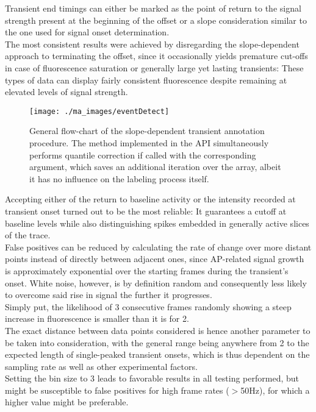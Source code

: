 \documentclass[titlepage]{article}
\begin{document}
Transient end timings can either be marked as the point of return to the signal strength present at the beginning of the offset or a slope consideration similar to the one used for signal onset determination.\\
The most consistent results were achieved by disregarding the slope-dependent approach to terminating the offset, since it occasionally yields premature cut-offs in case of fluorescence saturation or generally large yet lasting transients: These types of data can display fairly consistent fluorescence despite remaining at elevated levels of signal strength.\\
\begin{figure}[h]
\centering
\texttt{[image: ./ma\_images/eventDetect]}
\caption{General flow-chart of the slope-dependent transient annotation procedure. The method implemented in the API simultaneously performs quantile correction if called with the corresponding argument, which saves an additional iteration over the array, albeit it has no influence on the labeling process itself.}
\label{fig:eventDetect}
\end{figure}
Accepting either of the return to baseline activity or the intensity recorded at transient onset turned out to be the most reliable: It guarantees a cutoff at baseline levels while also distinguishing spikes embedded in generally active slices of the trace.\\
False positives can be reduced by calculating the rate of change over more distant points instead of directly between adjacent ones, since AP-related signal growth is approximately exponential over the starting frames during the transient's onset. White noise, however, is by definition random and consequently less likely to overcome said rise in signal the further it progresses.\\
Simply put, the likelihood of 3 consecutive frames randomly showing a steep increase in fluorescence is smaller than it is for 2.\\
The exact distance between data points considered is hence another parameter to be taken into consideration, with the general range being anywhere from 2 to the expected length of single-peaked transient onsets, which is thus dependent on the sampling rate as well as other experimental factors.\\
Setting the bin size to 3 leads to favorable results in all testing performed, but might be susceptible to false positives for high frame rates ($>$50Hz), for which a higher value might be preferable.
\end{document}
